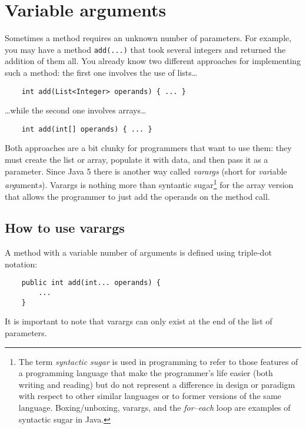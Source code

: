
\section{Variable arguments}
\label{sec:variable-arguments}

Sometimes a method requires an unknown number of parameters. For
example, you may have a method \verb+add(...)+ that took several
integers and returned the addition of them all. You already know two
different approaches for implementing such a method: the first one
involves the use of lists\ldots

\begin{verbatim}
    int add(List<Integer> operands) { ... }
\end{verbatim}

\ldots while the second one involves arrays\ldots

\begin{verbatim}
    int add(int[] operands) { ... }
\end{verbatim}

Both approaches are a bit clunky for programmers that want to use
them: they must create the list or array, populate it with data, and
then pass it as a parameter. 
%
Since Java 5 there is another way called \emph{varargs} (short for
\emph{var}iable \emph{arg}ument\emph{s}). Varargs is nothing more than
syntantic sugar\footnote{The term \emph{syntactic sugar} is used in
  programming to refer to those features of a programming language
  that make the programmer's life easier (both writing and reading)
  but do not represent a difference in design or paradigm with respect
  to other similar languages or to former versions of the same
  language. Boxing/unboxing, varargs, and the \emph{for--each} loop are 
  examples of syntactic sugar in Java.} for the array version
that allows the programmer to 
just add the operands on the method call. 

\subsection{How to use varargs}
\label{sec:how-use-varargs}

A method with a variable number of arguments is defined using
triple-dot notation: 

\begin{verbatim}
    public int add(int... operands) {
        ...
    }
\end{verbatim}

It is important to note that varargs can only exist at the end of the
list of parameters. 

